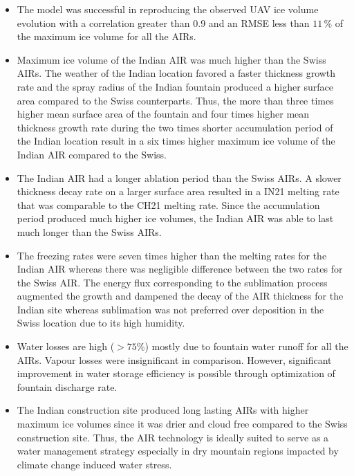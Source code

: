 \documentclass[utf8]{frontiersSCNS}
\begin{document}
\begin{itemize}
	\item The model was successful in reproducing the observed UAV ice volume evolution with a correlation greater
	      than 0.9 and an RMSE less than $11 \, \%$ of the maximum ice volume for all the AIRs.

	\item Maximum ice volume of the Indian AIR was much higher than the Swiss AIRs. The weather of the Indian
	      location favored a faster thickness growth rate and the spray radius of the Indian fountain produced a
	      higher surface area compared to the Swiss counterparts. Thus, the more than three times higher mean surface
	      area of the fountain and four times higher mean thickness growth rate during the two times shorter
	      accumulation period of the Indian location result in a six times higher maximum ice volume of the Indian AIR
	      compared to the Swiss.

	\item The Indian AIR had a longer ablation period than the Swiss AIRs. A slower thickness decay rate on a larger
	      surface area resulted in a IN21 melting rate that was comparable to the CH21 melting rate. Since the
	      accumulation period produced much higher ice volumes, the Indian AIR was able to last much longer than the
	      Swiss AIRs.

	\item The freezing rates were seven times higher than the melting rates for the Indian AIR whereas there was
	      negligible difference between the two rates for the Swiss AIR. The energy flux corresponding to the sublimation
	      process augmented the growth and dampened the decay of the AIR thickness for the Indian site whereas
	      sublimation was not preferred over deposition in the Swiss location due to its high humidity.

	\item Water losses are high ($>75\%$) mostly due to fountain water runoff for all the AIRs. Vapour losses were
	      insignificant in comparison. However, significant improvement in water storage efficiency is possible
	      through optimization of fountain discharge rate.

	\item The Indian construction site produced long lasting AIRs with higher maximum ice volumes since it was drier
	      and cloud free compared to the Swiss construction site. Thus, the AIR technology is ideally suited to serve as
	      a water management strategy especially in dry mountain regions impacted by climate change induced water
	      stress.

\end{itemize}
\end{document}

